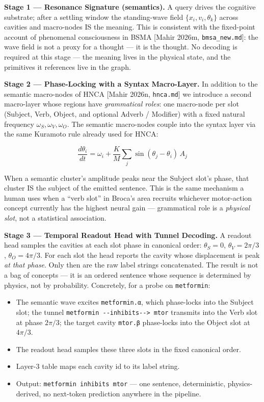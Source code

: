 \documentclass[
  11pt,
  a4paper,
]{article}
\providecommand{\tightlist}{%
  \setlength{\itemsep}{0pt}\setlength{\parskip}{0pt}}
\begin{document}
\textbf{Stage 1 --- Resonance Signature (semantics).} A query drives the
cognitive substrate; after a settling window the standing-wave field
\(\{x_i, v_i, \theta_k\}\) across cavities and macro-nodes IS the
meaning. This is consistent with the fixed-point account of phenomenal
consciousness in BSMA {[}Mahir 2026m, \texttt{bmsa\_new.md}{]}: the wave
field is not a proxy for a thought --- it is the thought. No decoding is
required at this stage --- the meaning lives in the physical state, and
the primitives it references live in the graph.

\textbf{Stage 2 --- Phase-Locking with a Syntax Macro-Layer.} In
addition to the semantic macro-nodes of HNCA {[}Mahir 2026n,
\texttt{hnca.md}{]} we introduce a second macro-layer whose regions have
\emph{grammatical roles}: one macro-node per slot (Subject, Verb,
Object, and optional Adverb / Modifier) with a fixed natural frequency
\(\omega_S, \omega_V, \omega_O\). The semantic macro-nodes couple into
the syntax layer via the same Kuramoto rule already used for HNCA:

\[
\frac{d\theta_i}{dt} = \omega_i + \frac{K}{M}\sum_j \sin(\theta_j - \theta_i)\,A_j
\]

When a semantic cluster's amplitude peaks near the Subject slot's phase,
that cluster IS the subject of the emitted sentence. This is the same
mechanism a human uses when a ``verb slot'' in Broca's area recruits
whichever motor-action concept currently has the highest neural gain ---
grammatical role is a \emph{physical slot}, not a statistical
association.

\textbf{Stage 3 --- Temporal Readout Head with Tunnel Decoding.} A
readout head samples the cavities at each slot phase in canonical order:
\(\theta_S = 0\), \(\theta_V = 2\pi/3\), \(\theta_O = 4\pi/3\). For each
slot the head reports the cavity whose displacement is peak \emph{at
that phase}. Only then are the raw label strings concatenated. The
result is not a bag of concepts --- it is an ordered sentence whose
sequence is determined by physics, not by probability. Concretely, for a
probe on \texttt{metformin}:

\begin{itemize}
\tightlist
\item
  The semantic wave excites \texttt{metformin.α}, which phase-locks into
  the Subject slot; the tunnel
  \texttt{metformin\ -\/-inhibits-\/-\textgreater{}\ mtor} transmits
  into the Verb slot at phase \(2\pi/3\); the target cavity
  \texttt{mtor.β} phase-locks into the Object slot at \(4\pi/3\).
\item
  The readout head samples these three slots in the fixed canonical
  order.
\item
  Layer-3 table maps each cavity id to its label string.
\item
  Output: \texttt{metformin\ inhibits\ mtor} --- one sentence,
  deterministic, physics-derived, no next-token prediction anywhere in
  the pipeline.
\end{itemize}
\end{document}
